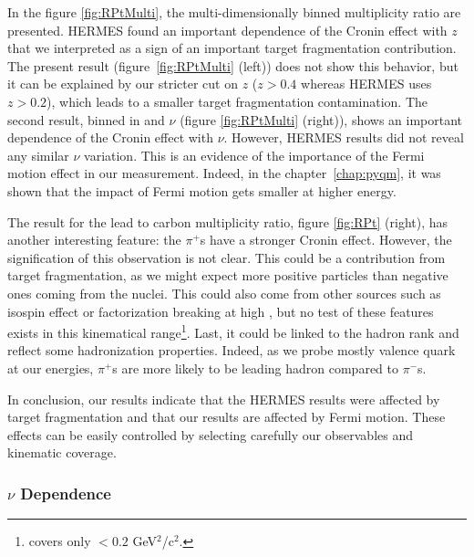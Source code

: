 In the figure \ref{fig:RPtMulti}, the multi-dimensionally binned multiplicity 
ratio are presented. HERMES found an important dependence of the Cronin effect 
with $z$ \cite{Airapetian:2007vu,Airapetian:2011jp} that we interpreted as a 
sign of an important target fragmentation contribution. The present result 
(figure~\ref{fig:RPtMulti} (left)) does not show this behavior, but it can be 
explained by our stricter cut on $z$ ($z>0.4$ whereas HERMES uses $z>0.2$), which 
leads to a smaller target fragmentation contamination. The second result, 
binned in \pt and $\nu$ (figure \ref{fig:RPtMulti} (right)), shows an important 
dependence of the Cronin effect with $\nu$. However, HERMES results did not 
reveal any similar $\nu$ variation. This is an evidence of the importance of 
the Fermi motion effect in our measurement. Indeed, in the 
chapter~\ref{chap:pyqm}, it was shown that the impact of Fermi motion gets 
smaller at higher energy.

The result for the lead to carbon multiplicity ratio, figure \ref{fig:RPt} 
(right), has another interesting feature: the $\pi^+$s have a stronger Cronin 
effect. However, the signification of this observation is not clear. This could be 
a contribution from target fragmentation, as we might expect more positive 
particles than negative ones coming from the nuclei.
This could also come from other sources such as isospin effect or factorization breaking at high 
\ptp, but no test of these features exists in this kinematical range\footnote{
\cite{Asaturyan:2011mq} covers only \pt$<0.2$ GeV$^2$/c$^2$.}. Last, it could 
be linked to the hadron rank and reflect some hadronization properties. Indeed, 
as we probe mostly valence quark at our energies, $\pi^+$s are more likely to 
be leading hadron compared to $\pi^-$s.

In conclusion, our results indicate that the HERMES results were affected by target 
fragmentation and that our results are affected by Fermi motion. These effects can 
be easily controlled by selecting carefully our observables and kinematic coverage.

\subsubsection{$\nu$ Dependence}

